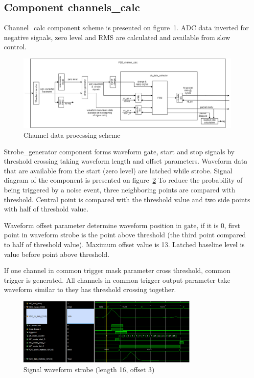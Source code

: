 \documentclass{article}
\begin{document}
\subsection{Component channels\_calc}
Channel\_calc component scheme is presented on figure~\ref{fig:2}. ADC data inverted for negative signals, zero level and RMS are calculated and available from slow control.

\begin{figure}[H]
	\centering 
	\includegraphics[width=1.0\textwidth]{ADC_event_collection.png}
	\caption{\label{fig:2} Channel data processing scheme}
\end{figure}

Strobe\_generator component forms waveform gate, start and stop signals by threshold crossing taking waveform length and offset parameters. Waveform data that are available from the start (zero level) are latched while strobe. Signal diagram of the component is presented on figure~\ref{fig:3} To reduce the probability of being triggered by a noise event, three neighboring points are compared with threshold. Central point is compared with the threshold value and two side points with half of threshold value.

Waveform offset parameter determine waveform position in gate, if it is 0, first point in waveform strobe is  the point above threshold (the third point compared to half of threshold value). Maximum offset value is 13. Latched baseline level is value before point above threshold.

If one channel in common trigger mask parameter cross threshold, common trigger is generated. All channels in common trigger output parameter take waveform similar to they has threshold crossing together.

\begin{figure}[H]
	\centering 
	\includegraphics[width=0.8\textwidth]{wf_strobe_diag_sim.png}
	\caption{\label{fig:3} Signal waveform strobe (length 16, offset 3)}
\end{figure}
\end{document}
